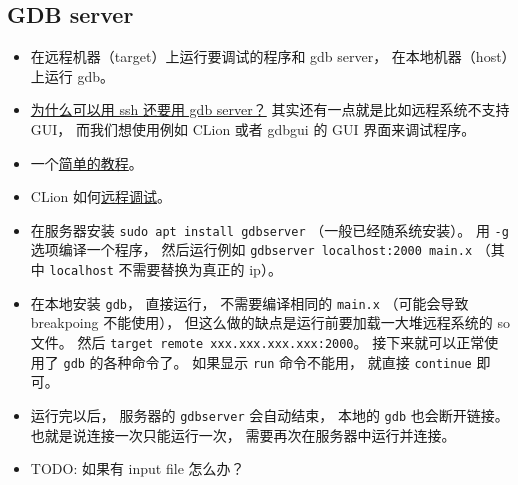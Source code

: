 \subsection{GDB server}
\begin{itemize}
\item 在远程机器（target）上运行要调试的程序和 gdb server， 在本地机器（host）上运行 gdb。
\item \href{https://stackoverflow.com/questions/69176457/the-difference-between-gdbserver-and-remote-gdb}{为什么可以用 ssh 还要用 gdb server？} 其实还有一点就是比如远程系统不支持 GUI， 而我们想使用例如 CLion 或者 gdbgui 的 GUI 界面来调试程序。
\item 一个\href{https://www.thegeekstuff.com/2014/04/gdbserver-example/}{简单的教程}。
\item CLion 如何\href{https://www.jetbrains.com/help/clion/remote-debug.html}{远程调试}。
\item 在服务器安装 \verb|sudo apt install gdbserver| （一般已经随系统安装）。 用 \verb|-g| 选项编译一个程序， 然后运行例如 \verb|gdbserver localhost:2000 main.x| （其中 \verb|localhost| 不需要替换为真正的 ip）。
\item 在本地安装 \verb|gdb|， 直接运行， 不需要编译相同的 \verb|main.x| （可能会导致 breakpoing 不能使用）， 但这么做的缺点是运行前要加载一大堆远程系统的 so 文件。 然后 \verb|target remote xxx.xxx.xxx.xxx:2000|。 接下来就可以正常使用了 \verb|gdb| 的各种命令了。 如果显示 \verb|run| 命令不能用， 就直接 \verb|continue| 即可。
\item 运行完以后， 服务器的 \verb|gdbserver| 会自动结束， 本地的 \verb|gdb| 也会断开链接。 也就是说连接一次只能运行一次， 需要再次在服务器中运行并连接。
\item TODO: 如果有 input file 怎么办？
\end{itemize}
